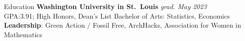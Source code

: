 \begin{rSection}{Education}
  {\bf Washington University in St.\ Louis} \hfill \textit{grad. May 2023} \smallskip \\
  {GPA:\@ 3.91; High Honors, Dean's List} \hfill {Bachelor of Arts: Statistics, Economics} \smallskip \\
  \textbf{Leadership}: Green Action / Fossil Free, ArchHacks, Association for Women in Mathematics

\vspace{-1mm}
\ifx\nocoursework\undefined
\else\fi

\vspace{3mm}

\end{rSection}
